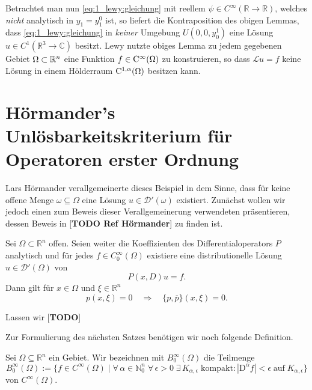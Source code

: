 Betrachtet man nun \eqref{eq:1_lewy:gleichung} mit reellem $\psi\in C^\infty(\mathbb{R}\rightarrow\mathbb{R})$, welches \textit{nicht} analytisch in $y_1=y_1^0$ ist, so liefert die Kontraposition des obigen Lemmas, dass \eqref{eq:1_lewy:gleichung} in \textit{keiner} Umgebung $U(0,0,y_0^1)$ eine Lösung $u\in C^1(\mathbb{R}^3\rightarrow\mathbb{C})$ besitzt. Lewy nutzte obiges Lemma zu jedem gegebenen Gebiet $\Omega\subset\mathbb R^n$ eine Funktion $f\in\mathrm C^\infty(\Omega)$ zu konstruieren, so dass $\mathscr Lu=f$ keine Lösung in einem Hölderraum $\mathrm C^{1,\alpha}(\Omega)$ besitzen kann.




\section{Hörmander's Unlösbarkeitskriterium für Operatoren erster Ordnung}
Lars Hörmander verallgemeinerte dieses Beispiel in dem Sinne, dass für keine offene Menge $\omega\subseteq\Omega$ eine Lösung $u\in\mathscr{D}'(\omega)$ existiert. Zunächst wollen wir jedoch einen zum Beweis dieser Verallgemeinerung verwendeten präsentieren, dessen Beweis in [\textbf{TODO Ref Hörmander}] zu finden ist.

\begin{thm}\label{thm:3.1_hoer}
Sei $\Omega\subset\mathbb{R}^n$ offen. Seien weiter die Koeffizienten des Differentialoperators $P$ analytisch und für jedes $f\in C_0^\infty(\Omega)$ existiere eine distributionelle Lösung $u\in\mathscr D'(\Omega)$ von
\begin{equation}\label{eq:3.1_hoer}
P(x,D)u=f.
\end{equation}
Dann gilt für $x\in\Omega$ und $\xi\in\mathbb{R}^n$
\begin{equation}\label{eq:3.1_hoer_aussage}
p(x,\xi)=0\quad\Rightarrow\quad \{p,\overline{p}\}(x,\xi)=0.
\end{equation}
\end{thm}

\begin{rem}
Lassen wir [\textbf{TODO}]
\end{rem}



Zur Formulierung des nächsten Satzes benötigen wir noch folgende Definition.

\begin{df}
Sei $\Omega\subseteq\mathbb{R}^n$ ein Gebiet. Wir bezeichnen mit $B_0^\infty(\Omega)$ die Teilmenge 
\begin{equation}
B_0^\infty(\Omega) :=\{f\in C^\infty(\Omega) \mid \forall\,\alpha\in\mathbb{N}_0^n\;\forall\,\epsilon >0\;\exists\,K_{\alpha,\epsilon}\;\mathrm{kompakt} : |\mathrm D^\alpha f|<\epsilon\;\mathrm{auf\;} K_{\alpha,\epsilon}\}
\end{equation}
von $C^\infty(\Omega)$.
\end{df}



